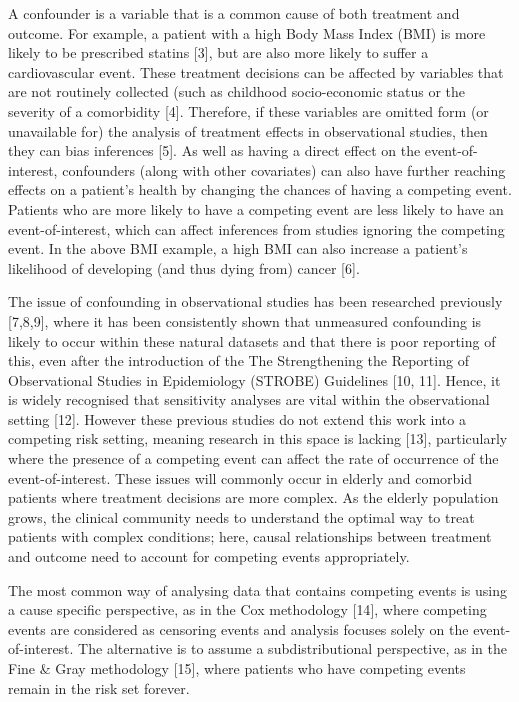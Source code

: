 \documentclass[12pt,twoside]{reedthesis}
\begin{document}
A confounder is a variable that is a common cause of both treatment and outcome. For example, a patient with a high Body Mass Index (BMI) is more likely to be prescribed statins {[}3{]}, but are also more likely to suffer a cardiovascular event. These treatment decisions can be affected by variables that are not routinely collected (such as childhood socio-economic status or the severity of a comorbidity {[}4{]}. Therefore, if these variables are omitted form (or unavailable for) the analysis of treatment effects in observational studies, then they can bias inferences {[}5{]}. As well as having a direct effect on the event-of-interest, confounders (along with other covariates) can also have further reaching effects on a patient's health by changing the chances of having a competing event. Patients who are more likely to have a competing event are less likely to have an event-of-interest, which can affect inferences from studies ignoring the competing event. In the above BMI example, a high BMI can also increase a patient's likelihood of developing (and thus dying from) cancer {[}6{]}.

The issue of confounding in observational studies has been researched previously {[}7,8,9{]}, where it has been consistently shown that unmeasured confounding is likely to occur within these natural datasets and that there is poor reporting of this, even after the introduction of the The Strengthening the Reporting of Observational Studies in Epidemiology (STROBE) Guidelines {[}10, 11{]}. Hence, it is widely recognised that sensitivity analyses are vital within the observational setting {[}12{]}. However these previous studies do not extend this work into a competing risk setting, meaning research in this space is lacking {[}13{]}, particularly where the presence of a competing event can affect the rate of occurrence of the event-of-interest. These issues will commonly occur in elderly and comorbid patients where treatment decisions are more complex. As the elderly population grows, the clinical community needs to understand the optimal way to treat patients with complex conditions; here, causal relationships between treatment and outcome need to account for competing events appropriately.

The most common way of analysing data that contains competing events is using a cause specific perspective, as in the Cox methodology {[}14{]}, where competing events are considered as censoring events and analysis focuses solely on the event-of-interest. The alternative is to assume a subdistributional perspective, as in the Fine \& Gray methodology {[}15{]}, where patients who have competing events remain in the risk set forever.
\end{document}
